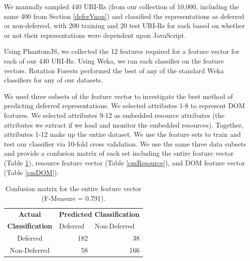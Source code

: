 \documentclass{ipres_proc_article-sp}
\begin{document}
We manually sampled 440 URI-Rs (from our collection of 10,000, including the same 400 from Section \ref{deferVnon}) and classified the representations as deferred or non-deferred, with 200 training and 20 test URI-Rs for each based on whether or not their representations were dependent upon JavaScript. 


Using PhantomJS, we collected the 12 features required for a feature vector for each of our 440 URI-Rs. Using Weka, we ran each classifier on the feature vectors. Rotation Forests \cite{rotationforest} performed the best of any of the standard Weka classifiers for any of our datasets.


We used three subsets of the feature vector to investigate the best method of predicting deferred representations. We selected attributes 1-8 to represent DOM features. We selected attributes 9-12 as embedded resource attributes (the attributes we extract if we load and monitor the embedded resources). Together, attributes 1-12 make up the entire dataset. We use the feature sets to train and test our classifier via 10-fold cross validation. We use the same three data subsets and provide a confusion matrix of each set including the entire feature vector (Table \ref{cmAll}), resource feature vector (Table \ref{cmResource}), and DOM feature vector (Table \ref{cmDOM}).

\begin{table}
\centering\begin{tabular}{cll}
\textbf{Actual} & \multicolumn{2}{c}{ \textbf{Predicted Classification}}                           \\
\textbf{Classification}   &          Deferred       &           Non-Deferred             \\ \cline{2-3} 
       Deferred           & \multicolumn{1}{|r}{182} & \multicolumn{1}{|r|}{38} \\ \cline{2-3} 
       Non-Deferred       & \multicolumn{1}{|r}{58} & \multicolumn{1}{|r|}{166} \\ \cline{2-3} 
\end{tabular}
 \caption{Confusion matrix for the entire feature vector (F-Measure = 0.791).}
  \label{cmAll}
\end{table}
\end{document}
